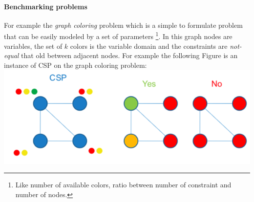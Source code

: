\documentclass[10pt,a4paper]{article}
\begin{document}
\paragraph{Benchmarking problems}
For example the \textit{graph coloring} problem which is a simple to formulate problem that can be easily modeled by a set of parameters \footnote{Like number of available colors, ratio between number of constraint and number of nodes.}. In this graph nodes are variables, the set of $k$ colors is the variable domain and the constraints are \textit{not-equal} that old between adjacent nodes. For example the following Figure is an instance of CSP on the graph coloring problem:\\
\includegraphics[scale=0.5]{images/graph_coloring.png}\\
\end{document}
